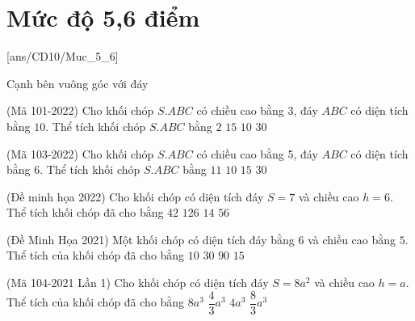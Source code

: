 \setcounter{dang}{0}
\setcounter{ex}{0}
\section{Mức độ 5,6 điểm}
[ans/CD10/Muc_5_6]
\begin{dang}
	{Cạnh bên vuông góc với đáy}
\end{dang}
\begin{ex}%
	(Mã 101-2022) Cho khối chóp $ S.ABC$ có chiều cao bằng $ 3$, đáy $ ABC$ có diện tích bằng $ 10$. Thể tích khối chóp $ S.ABC$ bằng
	\choice
	{$ 2$}
	{$ 15$}
	{\True $ 10$}
	{$ 30$}
\end{ex}

\begin{ex}%
	(Mã 103-2022) Cho khối chóp $ S.ABC$ có chiều cao bằng 5, đáy $ ABC$ có diện tích bằng $ 6$. Thể tích khối chóp $ S.ABC$ bằng 
	\choice
	{$ 11$}
	{\True $ 10$}
	{$ 15$}
	{$ 30$}
\end{ex}

\begin{ex}%
	(Đề minh họa 2022) Cho khối chóp có diện tích đáy $ S=7$ và chiều cao $h=6$. Thể tích khối chóp đã cho bằng
	\choice
	{$ 42$}
	{$ 126$}
	{\True $ 14$}
	{$ 56$}
\end{ex}

\begin{ex}%
	(Đề Minh Họa 2021) Một khối chóp có diện tích đáy bằng $6$ và chiều cao bằng $5$. Thể tích của khối chóp đã cho bằng
	\choice
	{\True $ 10$}
	{$ 30$}
	{$90$}
	{$15$}
\end{ex}

\begin{ex}%
	(Mã 104-2021 Lần 1) Cho khối chóp có diện tích đáy $ S=8a^2$ và chiều cao $h=a$. Thể tích của khối chóp đã cho bằng
	\choice
	{$ 8 a^3$}
	{$\dfrac{4}{3}a^3$}
	{$ 4 a^3$}
	{\True $\dfrac{8}{3}a^3$}
\end{ex}

